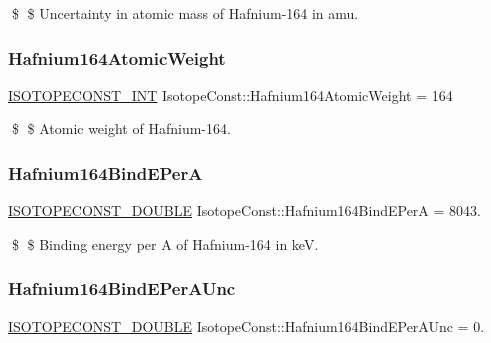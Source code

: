 \$ \$ Uncertainty in atomic mass of Hafnium-\/164 in amu. \mbox{\label{group___isotope_const-_hafnium-_hf164_gae73b583ca60dc337fe074e3b80256894}} 
\subsubsection{\texorpdfstring{Hafnium164\+Atomic\+Weight}{Hafnium164AtomicWeight}}
{\footnotesize\ttfamily \mbox{\hyperlink{group___isotope_const-_macros_ga5f18360b3e99483a35c32d789e62621c}{I\+S\+O\+T\+O\+P\+E\+C\+O\+N\+S\+T\+\_\+\+I\+NT}} Isotope\+Const\+::\+Hafnium164\+Atomic\+Weight = 164}

\$ \$ Atomic weight of Hafnium-\/164. \mbox{\label{group___isotope_const-_hafnium-_hf164_gadb49164349d42c8e5a847d44b201d104}} 
\subsubsection{\texorpdfstring{Hafnium164\+Bind\+E\+PerA}{Hafnium164BindEPerA}}
{\footnotesize\ttfamily \mbox{\hyperlink{group___isotope_const-_macros_ga8f45a7272ce02c0b4c65c44636ed719a}{I\+S\+O\+T\+O\+P\+E\+C\+O\+N\+S\+T\+\_\+\+D\+O\+U\+B\+LE}} Isotope\+Const\+::\+Hafnium164\+Bind\+E\+PerA = 8043.}

\$ \$ Binding energy per A of Hafnium-\/164 in keV. \mbox{\label{group___isotope_const-_hafnium-_hf164_ga4119cdc7f216d87d344353c8ef0fa1f8}} 
\subsubsection{\texorpdfstring{Hafnium164\+Bind\+E\+Per\+A\+Unc}{Hafnium164BindEPerAUnc}}
{\footnotesize\ttfamily \mbox{\hyperlink{group___isotope_const-_macros_ga8f45a7272ce02c0b4c65c44636ed719a}{I\+S\+O\+T\+O\+P\+E\+C\+O\+N\+S\+T\+\_\+\+D\+O\+U\+B\+LE}} Isotope\+Const\+::\+Hafnium164\+Bind\+E\+Per\+A\+Unc = 0.}


